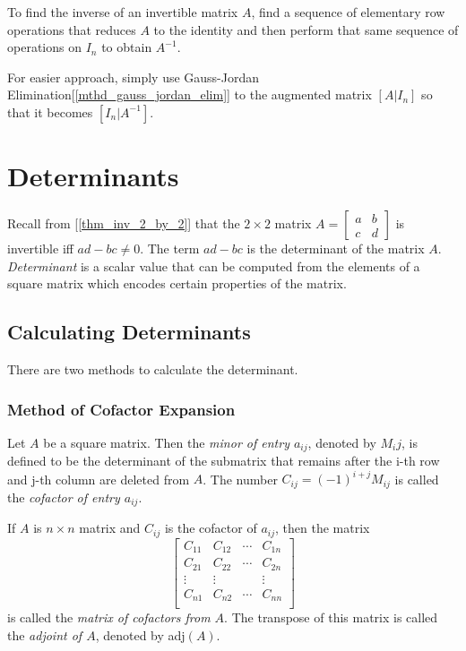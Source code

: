 \documentclass{report}
\begin{document}
		\begin{mthd}
			To find the inverse of an invertible matrix $A$, find a sequence of elementary row operations that reduces $A$ to the identity and then perform that same sequence of operations on $I_n$ to obtain $A^{-1}$.
			
			For easier approach, simply use Gauss-Jordan Elimination[\ref{mthd_gauss_jordan_elim}] to the augmented matrix $\left[A|I_n\right]$ so that it becomes $\left[I_n|A^{-1}\right]$.
		\end{mthd}
	
	\section{Determinants}
		Recall from [\ref{thm_inv_2_by_2}] that the $2 \times 2$ matrix $A=\begin{bmatrix} a & b \\ c & d \end{bmatrix}$ is invertible iff $ad-bc \ne 0$. The term $ad-bc$ is the determinant of the matrix $A$. \emph{Determinant} is a scalar value that can be computed from the elements of a square matrix which encodes certain properties of the matrix.
		\subsection{Calculating Determinants}
			There are two methods to calculate the determinant.
			\subsubsection{Method of Cofactor Expansion}
				\begin{defn}
					Let $A$ be a square matrix. Then the \emph{minor of entry $a_{ij}$}, denoted by $M_ij$, is defined to be the determinant of the submatrix that remains after the i-th row and j-th column are deleted from $A$. The number $C_{ij}=(-1)^{i+j}M_{ij}$ is called the \emph{cofactor of entry $a_{ij}$}.
				\end{defn}
				
				\begin{defn}[Adjoint]
					If $A$ is $n \times n$ matrix and $C_{ij}$ is the cofactor of $a_{ij}$, then the matrix
					\begin{displaymath}
					\begin{bmatrix}
						C_{11} & C_{12} & \cdots & C_{1n} \\
						C_{21} & C_{22} & \cdots & C_{2n} \\
						\vdots & \vdots &        & \vdots \\
						C_{n1} & C_{n2} & \cdots & C_{nn} \\
					\end{bmatrix}
					\end{displaymath}
					is called the \emph{matrix of cofactors from $A$}. The transpose of this matrix is called the \emph{adjoint of $A$}, denoted by adj$(A)$.
				\end{defn}
				
\end{document}
